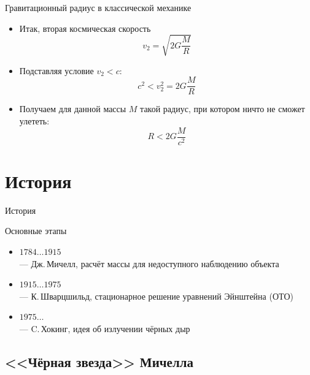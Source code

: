 \documentclass[usenames,dvipsnames,pdftex,unicode,hidelinks]{beamer}
\newcommand{\splashsection}[1]{
    \section{#1}
    \begin{frame}[plain]
      \begin{center}
        \LARGE #1
      \end{center}
    \end{frame}
  }
\begin{document}
  \begin{frame}{Гравитационный радиус в классической механике}
    \begin{itemize}
      \item<1-> Итак, вторая космическая скорость
        \[
          v_2 = \sqrt{2G\frac{M}{R}}
        \]
      \item<2-> Подставляя условие $v_2 < c$:
        \[
          c^2 < v_2^2 = 2G\frac{M}{R}
        \]
      \item<3-> Получаем для данной массы $M$ такой радиус, при котором ничто не сможет улететь:
        \[
          \boxed{
            R < 2G\frac{M}{c^2}
          }
        \]

    \end{itemize}
  \end{frame}

  \splashsection{История}

  \begin{frame}{Основные этапы}
    \begin{itemize}
      \item<1> $1784\dots1915$\\--- Дж.\,Мичелл, расчёт массы для недоступного наблюдению объекта 
      \item<2> $1915\dots1975$\\--- К.\,Шварцшильд, стационарное решение уравнений Эйнштейна (ОТО)
      \item<3> $1975\dots$\\--- C.\,Хокинг, идея об излучении чёрных дыр
    \end{itemize}
  \end{frame}

  \subsection{<<Чёрная звезда>> Мичелла}
    
\end{document}
